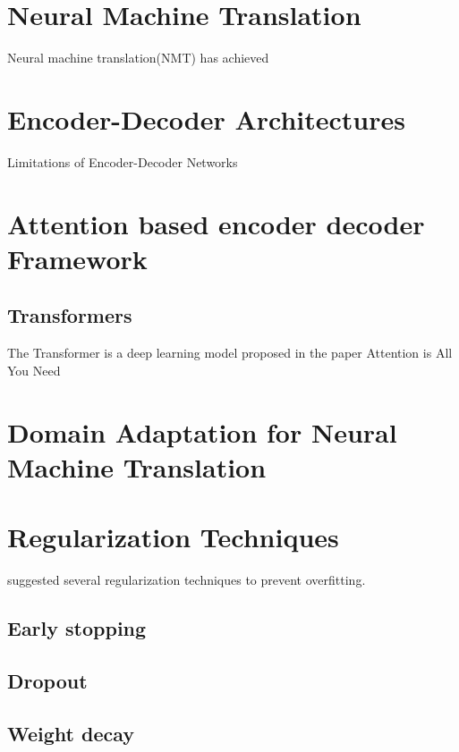 
\section{Neural Machine Translation}

Neural machine translation(NMT) has achieved

\section{Encoder-Decoder Architectures}

Limitations of Encoder-Decoder Networks

\section{Attention based encoder decoder Framework}
\subsection{Transformers}
The Transformer is a deep learning model proposed in the paper Attention is All You Need 
\section{Domain Adaptation for Neural Machine Translation}
\section{Regularization Techniques}
\parencite{arpit2017closer} suggested several regularization techniques to prevent overfitting. \\
\subsection{Early stopping}
\subsection{Dropout}
\subsection{Weight decay}
